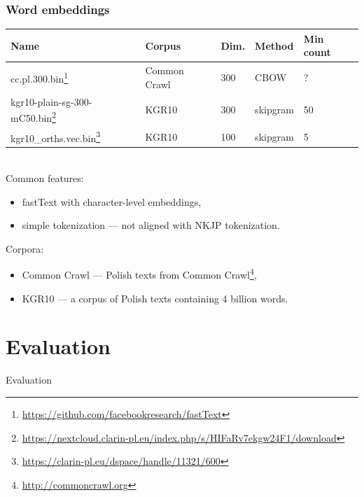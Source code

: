 \documentclass[Warsaw]{beamer}
\begin{document}

\begin{frame}
    \frametitle{Word embeddings}
    \scriptsize
    \begin{tabular}{l|l|l|l|l}
        \textbf{Name} & \textbf{Corpus} & \textbf{Dim.} & \textbf{Method} & \textbf{Min count} \\
        \hline
        cc.pl.300.bin\footnote{\tiny\url{https://github.com/facebookresearch/fastText}}  & Common Crawl & 300 & CBOW     & ? \\
        kgr10-plain-sg-300-mC50.bin\footnote{\tiny\url{https://nextcloud.clarin-pl.eu/index.php/s/HIFaRv7ekgw24F1/download}} & KGR10           & 300 & skipgram & 50\\
        kgr10\_orths.vec.bin\footnote{\tiny\url{https://clarin-pl.eu/dspace/handle/11321/600}}        & KGR10           & 100 & skipgram & 5\\
    \end{tabular}
    \vspace{1em}\\
    Common features:
    \begin{itemize}
        \item fastText with character-level embeddings,
        \item simple tokenization --- not aligned with NKJP tokenization.
    \end{itemize}
    Corpora:
    \begin{itemize}
        \item Common Crawl --- Polish texts from Common Crawl\footnote{\tiny\url{http://commoncrawl.org}},
        \item KGR10 --- a corpus of Polish texts containing 4 billion words.
    \end{itemize}
\end{frame}

    

\section{Evaluation}

\begin{frame}
    \begin{center}
        \Huge
        Evaluation
    \end{center}
\end{frame}
\end{document}
